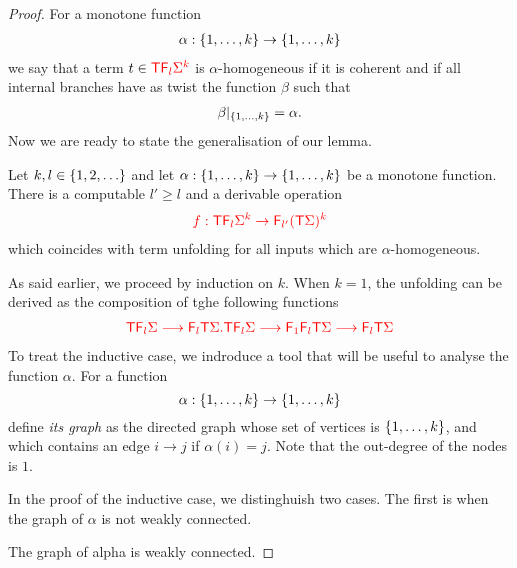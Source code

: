 \begin{proof}
For a monotone function 
\begin{align*}
\alpha: \{1,\ldots,k\} \to \{1,\ldots,k\}
\end{align*}
we say that a term $ t \in{\color{red}{{\color{red}{\mathsf T}}{\color{red}{\mathsf F_{l}}}\Sigma^k}}$ is $\alpha$-homogeneous if  it is coherent and if all internal branches have as twist the function $\beta$ such that
\begin{align*}
\beta|_{\{1,\dots,k\}}=\alpha.
\end{align*}
Now we are ready to state the generalisation of our lemma.
\begin{lemma}
 Let $k, l \in \{1,2,\ldots\}$ and let $\alpha : \{1,\ldots,k\} \to \{1,\ldots,k\}$ be a monotone function. There is a computable $l'\geq l$ and a derivable operation 
    \begin{align*}
        {\color{red}{f : {\color{red}{\mathsf T}}{\color{red}{\mathsf F_{l}}}{\color{red}{\Sigma}}^k \to {\color{red}{\mathsf F_{l'}}}({\color{red}{\mathsf T}}\Sigma)^k }}
        \end{align*}      
which coincides with term unfolding for all inputs which are $\alpha$-homogeneous.
\end{lemma}
As said earlier, we proceed by induction on $k$. 
When $k=1$, the unfolding can be derived as the composition of tghe following functions
\begin{align*}
{\color{red}{{\color{red}{\mathsf T}}{\color{red}{\mathsf F_{l}}}\Sigma \longrightarrow {\color{red}{{\color{red}{\mathsf F_{l}}}{\color{red}{\mathsf T}}\Sigma . {\color{red}{\mathsf T}}{\color{red}{\mathsf F_{l}}}\Sigma}} \longrightarrow {\color{red}{\mathsf F_{1}}}{\color{red}{\mathsf F_{l}}}{\color{red}{\mathsf T}}\Sigma \longrightarrow {\color{red}{\mathsf F_{l}}}{\color{red}{\mathsf T}}\Sigma }}
\end{align*}
To treat the inductive case, we indroduce a tool that will be useful to analyse the function $\alpha$. For a function $$\alpha: \{1,\ldots,k\} \to \{1,\ldots,k\}$$ define  \emph{its graph} as the directed graph whose set of vertices is $\{1,\ldots,k\}$, and which contains an edge $i\rightarrow j$ if $\alpha(i)=j$. Note that the out-degree of the nodes is $1.$

In the proof of the inductive case, we distinghuish two cases. The first is when the graph of $\alpha$ is not weakly connected.

The graph of alpha is weakly connected. 


\end{proof}
